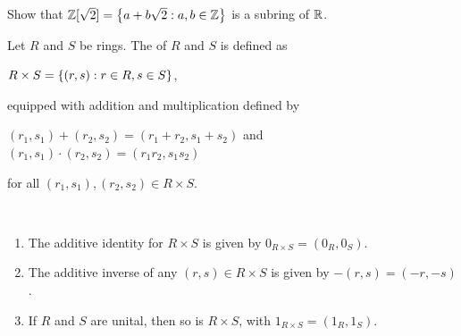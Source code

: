 \documentclass[11pt,fleqn,dvipsnames,usenames]{article}
\begin{document}
\begin{exercise}\label{zadjoinroottwosubringofreal}
Show that $\mathbb{Z}[\sqrt{2}] = \left\{a + b\sqrt{2}:a,b\in\mathbb{Z}\right\}$ is a subring of $\mathbb{R}$.
\end{exercise}
%
\begin{definition}
Let $R$ and $S$ be rings.  The  of $R$ and $S$ is defined as
\begin{center}
$R\times S = \left\{(r,s):r\in R,s\in S\right\}$,
\end{center}
equipped with addition and multiplication defined by
\begin{center}
$(r_1,s_1) + (r_2,s_2) = (r_1 + r_2,s_1 + s_2)$ and $(r_1,s_1)\cdot(r_2,s_2) = (r_1r_2,s_1s_2)$
\end{center}
for all $(r_1,s_1),(r_2,s_2)\in R\times S$.
\end{definition}
%
\begin{remarks}~
\begin{enumerate}[(1)]
\item The additive identity for $R\times S$ is given by $0_{R\times S} = (0_{R},0_{S})$.
\item The additive inverse of any $(r,s)\in R\times S$ is given by $-(r,s) = (-r,-s)$.
\item If $R$ and $S$ are unital, then so is $R\times S$, with $1_{R\times S} = (1_{R},1_{S})$.
\end{enumerate}
\end{remarks}
%
\end{document}
